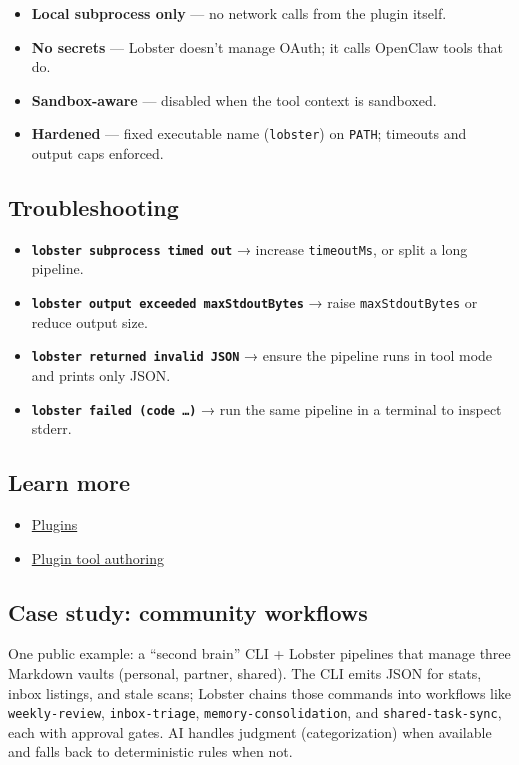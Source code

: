 \begin{itemize}
  \item \textbf{Local subprocess only} — no network calls from the plugin itself.
  \item \textbf{No secrets} — Lobster doesn't manage OAuth; it calls OpenClaw tools that do.
  \item \textbf{Sandbox-aware} — disabled when the tool context is sandboxed.
  \item \textbf{Hardened} — fixed executable name (\texttt{lobster}) on \texttt{PATH}; timeouts and output caps enforced.
\end{itemize}


\subsection{Troubleshooting}


\begin{itemize}
  \item \textbf{\texttt{lobster subprocess timed out}} → increase \texttt{timeoutMs}, or split a long pipeline.
  \item \textbf{\texttt{lobster output exceeded maxStdoutBytes}} → raise \texttt{maxStdoutBytes} or reduce output size.
  \item \textbf{\texttt{lobster returned invalid JSON}} → ensure the pipeline runs in tool mode and prints only JSON.
  \item \textbf{\texttt{lobster failed (code …)}} → run the same pipeline in a terminal to inspect stderr.
\end{itemize}


\subsection{Learn more}


\begin{itemize}
  \item \href{/tools/plugin}{Plugins}
  \item \href{/plugins/agent-tools}{Plugin tool authoring}
\end{itemize}


\subsection{Case study: community workflows}


One public example: a “second brain” CLI + Lobster pipelines that manage three Markdown vaults (personal, partner, shared). The CLI emits JSON for stats, inbox listings, and stale scans; Lobster chains those commands into workflows like \texttt{weekly-review}, \texttt{inbox-triage}, \texttt{memory-consolidation}, and \texttt{shared-task-sync}, each with approval gates. AI handles judgment (categorization) when available and falls back to deterministic rules when not.

